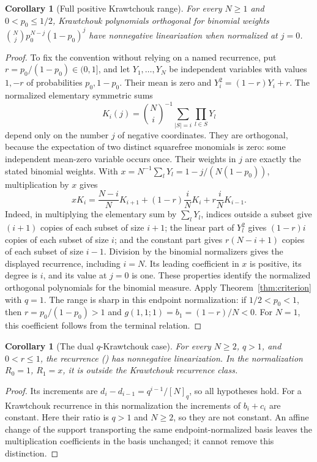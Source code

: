 \documentclass[twoside,10pt]{article}
\makeatletter
\numberwithin{equation}{section}
\theoremstyle{slbody}
\newtheorem{corollary}[theorem]{Corollary}
\theoremstyle{definition}
\theoremstyle{remark}
\renewcommand{\section}{\@startsection{section}{1}{\z@}{-3.5ex \@plus -1ex \@minus -.2ex}{2.3ex \@plus .2ex}{\normalfont\large\bfseries}}
\renewcommand{\eqref}[1]{\textup{{\normalfont(\oldstylenums{\ref{#1}}}\normalfont)}}
\makeatother
\begin{document}
\section{Applications and scope}\label{sec:applications}
\begin{corollary}[Full positive Krawtchouk range]\label{cor:kraw}
For every $N\geq1$ and $0<p_0\leq1/2$, Krawtchouk polynomials orthogonal for binomial weights $\binom Nj p_0^{N-j}(1-p_0)^j$ have nonnegative linearization when normalized at $j=0$.
\end{corollary}
\begin{proof}
To fix the convention without relying on a named recurrence, put $r=p_0/(1-p_0)\in(0,1]$, and let $Y_1,\ldots,Y_N$ be independent variables with values $1,-r$ of probabilities $p_0,1-p_0$. Their mean is zero and $Y_i^2=(1-r)Y_i+r$. The normalized elementary symmetric sums
\[
K_i(j)=\binom Ni^{-1}\sum_{|S|=i}\prod_{l\in S}Y_l
\]
depend only on the number $j$ of negative coordinates. They are orthogonal, because the expectation of two distinct squarefree monomials is zero: some independent mean-zero variable occurs once. Their weights in $j$ are exactly the stated binomial weights. With $x=N^{-1}\sum_lY_l=1-j/(N(1-p_0))$, multiplication by $x$ gives
\[
xK_i=\frac{N-i}{N}K_{i+1}+(1-r)\frac iN K_i+r\frac iN K_{i-1}.
\]
Indeed, in multiplying the elementary sum by $\sum_lY_l$, indices outside a subset give $(i+1)$ copies of each subset of size $i+1$; the linear part of $Y_l^2$ gives $(1-r)i$ copies of each subset of size $i$; and the constant part gives $r(N-i+1)$ copies of each subset of size $i-1$. Division by the binomial normalizers gives the displayed recurrence, including $i=N$. Its leading coefficient in $x$ is positive, its degree is $i$, and its value at $j=0$ is one. These properties identify the normalized orthogonal polynomials for the binomial measure. Apply Theorem~\ref{thm:criterion} with $q=1$.
The range is sharp in this endpoint normalization: if $1/2<p_0<1$, then
$r=p_0/(1-p_0)>1$ and $g(1,1;1)=b_1=(1-r)/N<0$.
For $N=1$, this coefficient follows from the terminal relation.
\end{proof}

\begin{corollary}[The dual $q$-Krawtchouk case]\label{cor:additional}
For every $N\geq2$, $q>1$, and $0<r\leq1$, the recurrence \eqref{eq:parameters} has nonnegative linearization. In the normalization $R_0=1$, $R_1=x$, it is outside the Krawtchouk recurrence class.
\end{corollary}
\begin{proof}
Its increments are $d_i-d_{i-1}=q^{i-1}/[N]_q$, so all hypotheses hold. For a Krawtchouk recurrence in this normalization the increments of $b_i+c_i$ are constant. Here their ratio is $q>1$ and $N\geq2$, so they are not constant. An affine change of the support transporting the same endpoint-normalized basis leaves the multiplication coefficients in the basis unchanged; it cannot remove this distinction.
\end{proof}
\end{document}
